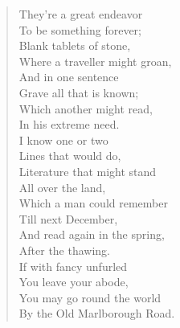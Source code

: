 \documentclass[twoside,openright,10pt]{memoir} %
\begin{document}
\begin{verse}
\hspace{2em}They’re a great endeavor \\
\hspace{2em}To be something forever; \\
\hspace{2em}Blank tablets of stone, \\
\hspace{2em}Where a traveller might groan, \\
\hspace{2em}And in one sentence \\
\hspace{2em}Grave all that is known; \\
\hspace{2em}Which another might read, \\
\hspace{2em}In his extreme need. \\
\hspace{2em}I know one or two \\
\hspace{2em}Lines that would do, \\
\hspace{2em}Literature that might stand \\
\hspace{2em}All over the land, \\
\hspace{2em}Which a man could remember \\
\hspace{2em}Till next December, \\
\hspace{2em}And read again in the spring, \\
\hspace{2em}After the thawing. \\
\hspace{0em}If with fancy unfurled \\
\hspace{1em}You leave your abode, \\
\hspace{0em}You may go round the world \\
\hspace{1em}By the Old Marlborough Road.
\end{verse}
\end{document}
